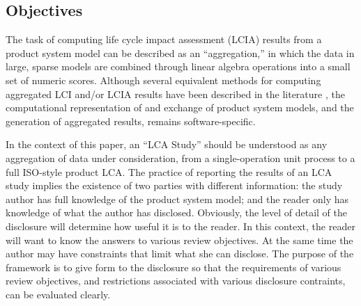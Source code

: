 \subsection{Objectives}

The task of computing life cycle impact assessment (LCIA) results from a product system model can be described as an ``aggregation,'' in which the data in large, sparse models are combined through linear algebra operations into a small set of numeric scores.  Although several equivalent methods for computing aggregated LCI and/or LCIA results have been described in the literature \citep{Suh_2005, Peters_2007}, the computational representation of and exchange of product system models, and the generation of aggregated results, remains software-specific.  

In the context of this paper, an ``LCA Study'' should be understood as any aggregation of data under consideration, from a single-operation unit process to a full ISO-style product LCA.  The practice of reporting the results of an LCA study implies the existence of two parties with different information: the study author has full knowledge of the product system model; and the reader only has knowledge of what the author has disclosed.  Obviously, the level of detail of the disclosure will determine how useful it is to the reader.  In this context, the reader will want to know the answers to various review objectives.  
At the same time the author may have constraints that limit what she can disclose.  The purpose of the framework is to give form to the disclosure so that the requirements of various review objectives, and restrictions associated with various disclosure contraints, can be evaluated clearly.


